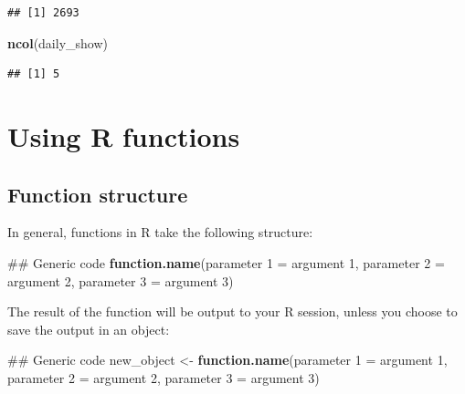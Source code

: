 \documentclass[]{book}
\makeatletter
\newenvironment{Shaded}{\begin{snugshade}}{\end{snugshade}}
\newcommand{\KeywordTok}[1]{\textcolor[rgb]{0.13,0.29,0.53}{\textbf{{#1}}}}
\newcommand{\DecValTok}[1]{\textcolor[rgb]{0.00,0.00,0.81}{{#1}}}
\newcommand{\StringTok}[1]{\textcolor[rgb]{0.31,0.60,0.02}{{#1}}}
\newcommand{\NormalTok}[1]{{#1}}
\newenvironment{kframe}{%
\medskip{}
\setlength{\fboxsep}{.8em}
 \def\at@end@of@kframe{}%
 \ifinner\ifhmode%
  \def\at@end@of@kframe{\end{minipage}}%
  \begin{minipage}{\columnwidth}%
 \fi\fi%
 \def\FrameCommand##1{\hskip\@totalleftmargin \hskip-\fboxsep
 \colorbox{shadecolor}{##1}\hskip-\fboxsep
     \hskip-\linewidth \hskip-\@totalleftmargin \hskip\columnwidth}%
 \MakeFramed {\advance\hsize-\width
   \@totalleftmargin\z@ \linewidth\hsize
   \@setminipage}}%
 {\par\unskip\endMakeFramed%
 \at@end@of@kframe}
\renewenvironment{Shaded}{\begin{kframe}}{\end{kframe}}
\makeatother
\begin{document}
\begin{verbatim}
## [1] 2693
\end{verbatim}

\begin{Shaded}
\begin{Highlighting}[]
\KeywordTok{ncol}\NormalTok{(daily_show)}
\end{Highlighting}
\end{Shaded}

\begin{verbatim}
## [1] 5
\end{verbatim}

\section{Using R functions}\label{using-r-functions}

\subsection{Function structure}\label{function-structure}

In general, functions in R take the following structure:

\begin{Shaded}
\begin{Highlighting}[]
\NormalTok{## Generic code}
\KeywordTok{function.name}\NormalTok{(parameter }\DecValTok{1} \NormalTok{=}\StringTok{ }\NormalTok{argument }\DecValTok{1}\NormalTok{, parameter }\DecValTok{2} \NormalTok{=}\StringTok{ }\NormalTok{argument }\DecValTok{2}\NormalTok{,}
              \NormalTok{parameter }\DecValTok{3} \NormalTok{=}\StringTok{ }\NormalTok{argument }\DecValTok{3}\NormalTok{)  }
\end{Highlighting}
\end{Shaded}

The result of the function will be output to your R session, unless you
choose to save the output in an object:

\begin{Shaded}
\begin{Highlighting}[]
\NormalTok{## Generic code}
\NormalTok{new_object <-}\StringTok{ }\KeywordTok{function.name}\NormalTok{(parameter }\DecValTok{1} \NormalTok{=}\StringTok{ }\NormalTok{argument }\DecValTok{1}\NormalTok{,}
                            \NormalTok{parameter }\DecValTok{2} \NormalTok{=}\StringTok{ }\NormalTok{argument }\DecValTok{2}\NormalTok{,}
                            \NormalTok{parameter }\DecValTok{3} \NormalTok{=}\StringTok{ }\NormalTok{argument }\DecValTok{3}\NormalTok{)  }
\end{Highlighting}
\end{Shaded}
\end{document}
